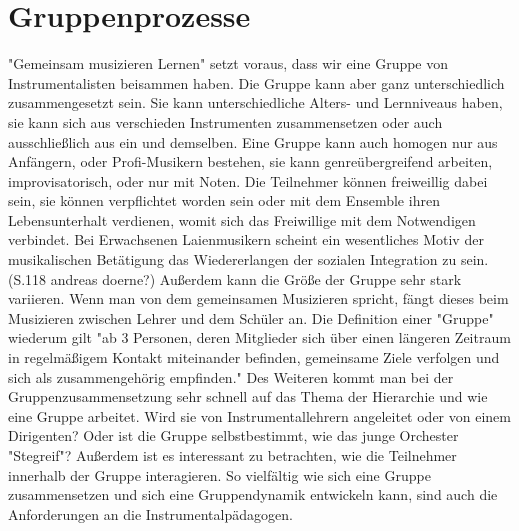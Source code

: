 \section{Gruppenprozesse}
"Gemeinsam musizieren Lernen" setzt voraus, dass wir eine Gruppe von
Instrumentalisten beisammen haben. Die Gruppe kann aber ganz unterschiedlich
zusammengesetzt sein. Sie kann unterschiedliche Alters- und Lernniveaus haben,
sie kann sich aus verschieden Instrumenten zusammensetzen oder auch
ausschließlich aus ein und demselben. Eine Gruppe kann auch homogen nur aus
Anfängern, oder Profi-Musikern bestehen, sie kann genreübergreifend arbeiten,
improvisatorisch, oder nur mit Noten. Die Teilnehmer können freiweillig dabei
sein, sie können verpflichtet worden sein oder mit dem Ensemble ihren
Lebensunterhalt verdienen, womit sich das Freiwillige mit dem Notwendigen
verbindet. Bei Erwachsenen Laienmusikern scheint ein wesentliches Motiv der
musikalischen Betätigung das Wiedererlangen der sozialen Integration zu sein.
(S.118 andreas doerne?) Außerdem kann die Größe der Gruppe sehr stark variieren.
Wenn man von dem gemeinsamen Musizieren spricht, fängt dieses beim Musizieren
zwischen Lehrer und dem Schüler an. Die Definition einer "Gruppe" wiederum gilt
"ab 3 Personen, deren Mitglieder sich über einen längeren Zeitraum in
regelmäßigem Kontakt miteinander befinden, gemeinsame Ziele verfolgen und sich
als zusammengehörig empfinden."
\autocite{wikipedia:gruppe}
Des Weiteren kommt man bei der Gruppenzusammensetzung sehr schnell auf das Thema
der Hierarchie und wie eine Gruppe arbeitet. Wird sie von Instrumentallehrern
angeleitet oder von einem Dirigenten? Oder ist die Gruppe selbstbestimmt, wie
das junge Orchester "Stegreif"? Außerdem ist es interessant zu betrachten, wie
die Teilnehmer innerhalb der Gruppe interagieren. So vielfältig wie sich eine
Gruppe zusammensetzen und sich eine Gruppendynamik entwickeln kann, sind auch
die Anforderungen an die Instrumentalpädagogen.


